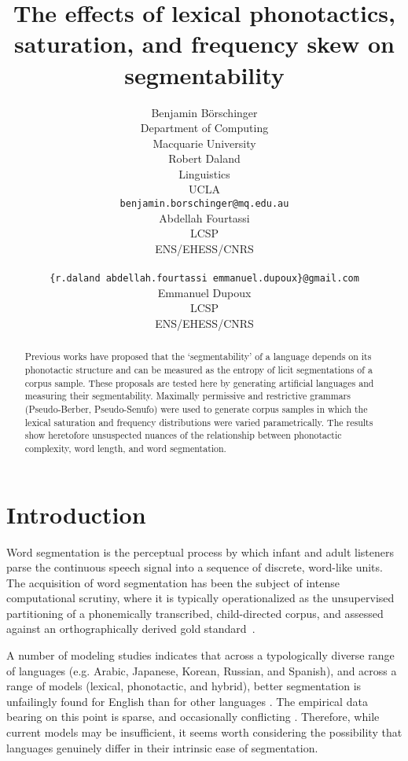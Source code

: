 \documentclass[11pt]{article}
\title{The effects of lexical phonotactics, saturation,
  and frequency skew on segmentability}
\author{Benjamin B{\"o}rschinger \\
    Department of Computing \\
    Macquarie University \\\And
  Robert Daland \\
    Linguistics \\
    UCLA \\
    {\tt benjamin.borschinger@mq.edu.au} \\\And
  Abdellah Fourtassi \\
    LCSP \\
    ENS/EHESS/CNRS \\
    \\
    {\tt \{r.daland\,abdellah.fourtassi\,emmanuel.dupoux\}@gmail.com} \\\And
  Emmanuel Dupoux \\
    LCSP \\
    ENS/EHESS/CNRS }
\date{}
\begin{document}
\maketitle
\begin{abstract}
  Previous works have proposed that the `segmentability' of a language
  depends on its phonotactic structure and can be measured as the
  entropy of licit segmentations of a corpus sample. These proposals
  are tested here by generating artificial languages and measuring
  their segmentability. Maximally permissive and restrictive grammars
  (Pseudo-Berber, Pseudo-Senufo) were used to generate corpus samples 
  in which the lexical saturation and frequency distributions were
  varied parametrically. The results show heretofore  unsuspected
  nuances of the relationship between phonotactic complexity, word
  length, and word segmentation.
\end{abstract}


\section{Introduction}

Word segmentation is the perceptual process by which infant and adult listeners parse the continuous speech signal into a sequence of discrete, word-like units. The acquisition of word segmentation has been the subject of intense computational scrutiny, where it is typically operationalized as the unsupervised partitioning of a phonemically transcribed, child-directed corpus, and assessed against an orthographically derived gold standard~\cite{Goldwater09a,Daland11a,Pearl10b}.

A number of modeling studies indicates that across a typologically diverse range of languages (e.g. Arabic, Japanese, Korean, Russian, and Spanish), and across a range of models (lexical, phonotactic, and hybrid), better segmentation is unfailingly found for English than for other languages \cite{Fleck08a,Daland09a,Daland11a,Fourtassi13a,Daland13a}. The empirical data bearing on this point is sparse, and occasionally conflicting \cite{Nazzi06a,Nazzi14a}. Therefore, while current models may be insufficient, it seems worth considering the possibility that languages genuinely differ in their intrinsic ease of segmentation.
\end{document}
